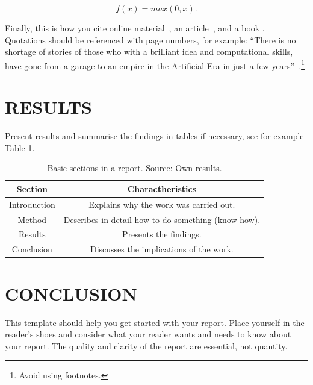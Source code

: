 \documentclass[11pt,a4paper]{article}
\begin{document}
\begin{equation} \label{e:1}
f(x)=max(0,x). 
\end{equation}

Finally, this is how you cite online material~, an article~, and a book . Quotations should be referenced with page numbers, for example: ``There is no shortage of stories of those who with a brilliant idea and computational skills, have gone from a garage to an empire in the Artificial Era in just a few years''~.\footnote{Avoid using footnotes.} 


\section{RESULTS}
Present results and summarise the findings in tables if necessary, see for example Table \ref{table:1}.
\begin{table}[h!]
\centering
\begin{tabular}{|c c|} 
 \hline
Section &  Charactheristics \\  \hline
Introduction &  Explains why the work was carried out. \\ 
Method   & Describes in detail how to do something (know-how).\\ 
Results  & Presents the findings.\\
Conclusion  & Discusses the implications of the work.\\

 \hline
\end{tabular}
\caption{Basic sections in a report. Source: Own results.}
\label{table:1}
\end{table}

\section{CONCLUSION}
This template should help you get started with your report. Place yourself in the reader's shoes and consider what your reader wants and needs to know about your report. The quality and clarity of the report are essential, not quantity. 




\end{document}
